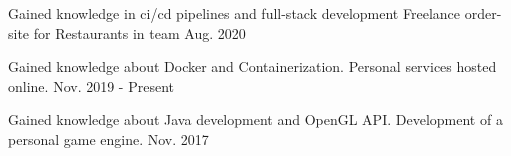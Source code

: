 

\begin{cventries}

  \cventry
    {Gained knowledge in ci/cd pipelines and full-stack development} %
    {Freelance order-site for Restaurants in team} %
    {} %
    {Aug. 2020} %

  \cventry
    {Gained knowledge about Docker and Containerization.} %
    {Personal services hosted online.} %
    {} %
    {Nov. 2019 - Present} %

  \cventry
    {Gained knowledge about Java development and OpenGL API.} %
    {Development of a personal game engine.} %
    {} %
    {Nov. 2017} %

\end{cventries}
